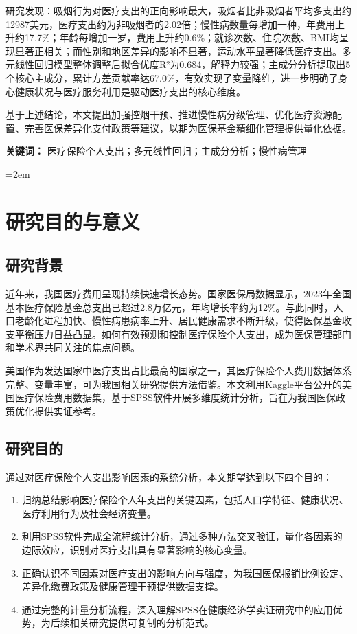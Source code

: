 \documentclass[a4paper]{ctexart}
\begin{document}
研究发现：吸烟行为对医疗支出的正向影响最大，吸烟者比非吸烟者平均多支出约12987美元，医疗支出约为非吸烟者的2.02倍；慢性病数量每增加一种，年费用上升约17.7\%；年龄每增加一岁，费用上升约0.6\%；就诊次数、住院次数、BMI均呈现显著正相关；而性别和地区差异的影响不显著，运动水平显著降低医疗支出。多元线性回归模型整体调整后拟合优度R²为0.684，解释力较强；主成分分析提取出5个核心主成分，累计方差贡献率达67.0\%，有效实现了变量降维，进一步明确了身心健康状况与医疗服务利用是驱动医疗支出的核心维度。

基于上述结论，本文提出加强控烟干预、推进慢性病分级管理、优化医疗资源配置、完善医保差异化支付政策等建议，以期为医保基金精细化管理提供量化依据。

\vspace{1em}
\noindent\textbf{关键词：} 医疗保险个人支出；多元线性回归；主成分分析；慢性病管理

\newpage
\thispagestyle{myplain}
\tableofcontents

\newpage
\pagestyle{fancy}
\parindent=2em

\section{研究目的与意义}

\subsection{研究背景}

近年来，我国医疗费用呈现持续快速增长态势。国家医保局数据显示，2023年全国基本医疗保险基金总支出已超过2.8万亿元，年均增长率约为12\%。与此同时，人口老龄化进程加快、慢性病患病率上升、居民健康需求不断升级，使得医保基金收支平衡压力日益凸显。如何有效预测和控制医疗保险个人支出，成为医保管理部门和学术界共同关注的焦点问题。

美国作为发达国家中医疗支出占比最高的国家之一，其医疗保险个人费用数据体系完整、变量丰富，可为我国相关研究提供方法借鉴。本文利用Kaggle平台公开的美国医疗保险费用数据集，基于SPSS软件开展多维度统计分析，旨在为我国医保政策优化提供实证参考。

\subsection{研究目的}

通过对医疗保险个人支出影响因素的系统分析，本文期望达到以下四个目的：

\begin{enumerate}[label=(\arabic*)]
\item 归纳总结影响医疗保险个人年支出的关键因素，包括人口学特征、健康状况、医疗利用行为及社会经济变量。
\item 利用SPSS软件完成全流程统计分析，通过多种方法交叉验证，量化各因素的边际效应，识别对医疗支出具有显著影响的核心变量。
\item 正确认识不同因素对医疗支出的影响方向与强度，为我国医保报销比例设定、差异化缴费政策及健康管理干预提供数据支撑。
\item 通过完整的计量分析流程，深入理解SPSS在健康经济学实证研究中的应用优势，为后续相关研究提供可复制的分析范式。
\end{enumerate}
\end{document}
